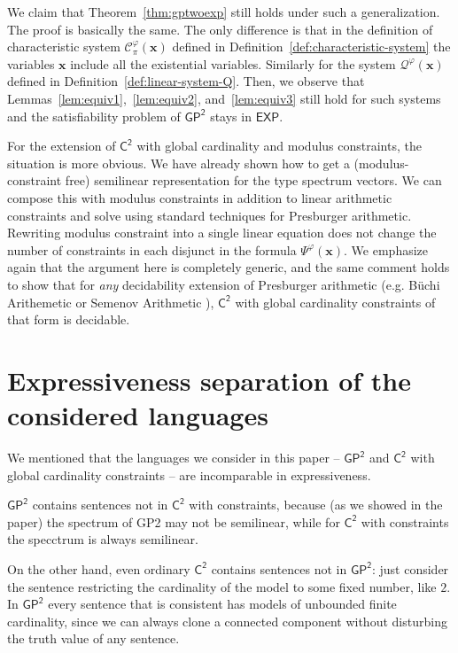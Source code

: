 \documentclass[10pt,a4paper]{article}
\theoremstyle{definition}
\theoremstyle{remark}
\newcommand{\cC}{\mathcal{C}}
\newcommand{\cQ}{\mathcal{Q}}
\newcommand{\bfx}{\mathbf{x}}
\newcommand{\mexp}  {\mathsf{EXP}}
\newcommand{\exptime}{\mexp}
\newcommand{\Ctwo}    {\mathsf{C^2}}
\newcommand{\GPtwo}   {\mathsf{GP^2}}
\begin{document}
We claim that Theorem~\ref{thm:gptwoexp} still holds under such a generalization.
The proof is basically the same.
The only difference is that in the definition of characteristic system
$\cC^\varphi_\pi(\bfx)$
defined in Definition~\ref{def:characteristic-system} the variables $\bfx$ include all the existential variables.
Similarly for the system $\cQ^\varphi(\bfx)$
defined in Definition~\ref{def:linear-system-Q}.
Then, we observe that
Lemmas~\ref{lem:equiv1},~\ref{lem:equiv2}, and~\ref{lem:equiv3} still hold for such systems
and the satisfiability problem of $\GPtwo$ stays in $\exptime$.

For the extension of $\Ctwo$ with global cardinality and modulus constraints, the situation is more obvious. We have already shown how to get a (modulus-constraint free) semilinear representation for the type spectrum vectors. We can compose this with modulus constraints in addition to linear arithmetic constraints and solve using standard techniques for Presburger arithmetic. 
Rewriting modulus constraint into a single linear equation does not change the number of constraints in each disjunct in the formula $\Psi^{\varphi}(\bfx)$.
We emphasize again that the argument here is completely generic, and the same comment holds to show that for \emph{any} decidability extension of Presburger arithmetic (e.g. B\"uchi Arithemetic or Semenov Arithmetic \cite{semenovpresexp}), $\Ctwo$ with global cardinality constraints of that form is decidable.


\section*{Expressiveness separation of the considered languages}
We mentioned that the languages we consider in this paper -- $\GPtwo$ and $\Ctwo$ with global cardinality constraints -- are incomparable in expressiveness.

$\GPtwo$  contains sentences not in $\Ctwo$ with constraints, because (as we showed in the paper) the spectrum of GP2 may not be semilinear, while for $\Ctwo$ with constraints the specctrum is always semilinear.

On the other hand, even ordinary $\Ctwo$ contains sentences not in $\GPtwo$: just consider the sentence restricting the cardinality of the model to some fixed number, like $2$. In $\GPtwo$ every sentence that is consistent has models of unbounded finite cardinality, since we can always clone a connected component without disturbing the truth value of any sentence.
\end{document}
